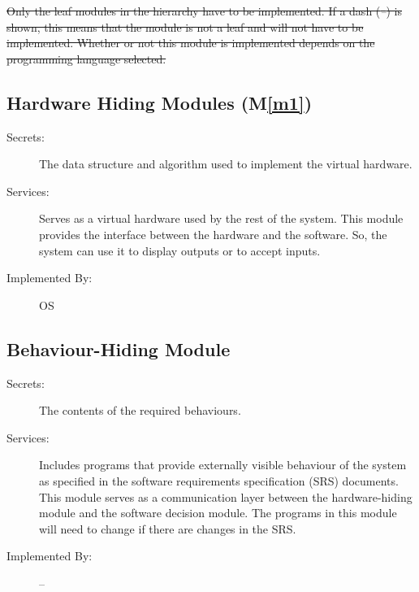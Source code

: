 \documentclass[12pt, titlepage]{article}
\newcommand{\mref}[1]{M\ref{#1}}
\begin{document}
\sout{Only the leaf modules in the hierarchy have to be implemented. If a dash (\emph{--}) is shown, this means that the module is not a leaf and will not have to be implemented. Whether or not this module is implemented depends on the programming language selected.}

\subsection{Hardware Hiding Modules (\mref{m1})}
\begin{description}
    \item[Secrets:] The data structure and algorithm used to implement the virtual hardware.
    \item[Services:] Serves as a virtual hardware used by the rest of the system. This module provides the interface between the hardware and the software. So, the system can use it to display outputs or to accept inputs.
    \item[Implemented By:] OS
\end{description}

\subsection{Behaviour-Hiding Module}

\begin{description}
\item[Secrets:] The contents of the required behaviours.
\item[Services:] Includes programs that provide externally visible behaviour of
  the system as specified in the software requirements specification (SRS)
  documents. This module serves as a communication layer between the
  hardware-hiding module and the software decision module. The programs in this
  module will need to change if there are changes in the SRS.
\item[Implemented By:] --
\end{description}

\end{document}
